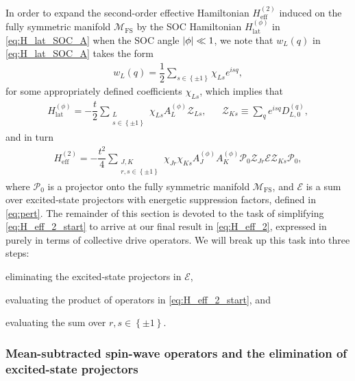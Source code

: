 \documentclass[nofootinbib,notitlepage,11pt]{revtex4-2}
\renewcommand{\t}{\text} %
\newcommand{\f}[2]{\dfrac{#1}{#2}} %
\newcommand{\p}[1]{\left(#1\right)} %
\renewcommand{\set}[1]{\left\{#1\right\}} %
\newcommand{\1}{\mathds{1}}
\newcommand{\E}{\mathcal{E}}
\newcommand{\M}{\mathcal{M}}
\renewcommand{\P}{\mathcal{P}}
\newcommand{\Z}{\mathcal{Z}}
\newcommand{\FS}{\text{FS}}
\begin{document}
In order to expand the second-order effective Hamiltonian
$H_{\t{eff}}^{(2)}$ induced on the fully symmetric manifold $\M_\FS$
by the SOC Hamiltonian $H_{\t{lat}}^{(\phi)}$ in
\eqref{eq:H_lat_SOC_A} when the SOC angle $\abs{\phi}\ll1$, we note
that $w_L\p{q}$ in \eqref{eq:H_lat_SOC_A} takes the form
\begin{align}
  w_L\p{q} = \f12 \sum_{s\in\set{\pm1}} \chi_{Ls} e^{isq},
  \label{eq:w_chi}
\end{align}
for some appropriately defined coefficients $\chi_{Ls}$, which implies
that
\begin{align}
  H_{\t{lat}}^{(\phi)}
  = -\f{t}{2} \sum_{\substack{L\\s\in\set{\pm1}}}
  \chi_{Ls} A_L^{(\phi)} \Z_{Ls},
  &&
  \Z_{Ks} \equiv \sum_q e^{isq} D_{L,0}^{(q)},
\end{align}
and in turn
\begin{align}
  H_{\t{eff}}^{(2)}
  = -\f{t^2}{4} \sum_{\substack{J,K\\r,s\in\set{\pm1}}}
  \chi_{Jr} \chi_{Ks} A_J^{(\phi)} A_K^{(\phi)}
  \P_0 \Z_{Jr} \E \Z_{Ks} \P_0,
  \label{eq:H_eff_2_start}
\end{align}
where $\P_0$ is a projector onto the fully symmetric manifold
$\M_\FS$, and $\E$ is a sum over excited-state projectors with
energetic suppression factors, defined in \eqref{eq:pert}.  The
remainder of this section is devoted to the task of simplifying
\eqref{eq:H_eff_2_start} to arrive at our final result in
\eqref{eq:H_eff_2}, expressed in purely in terms of collective drive
operators.  We will break up this task into three steps:
\begin{enumerate*}
\item eliminating the excited-state projectors in $\E$,
\item evaluating the product of operators in \eqref{eq:H_eff_2_start},
  and
\item evaluating the sum over $r,s\in\set{\pm1}$.
\end{enumerate*}


\subsubsection{Mean-subtracted spin-wave operators and the elimination
  of excited-state projectors}
\end{document}
